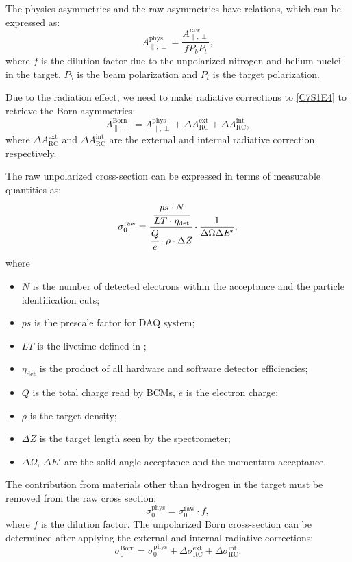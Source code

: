 The physics asymmetries and the raw asymmetries have relations, which can be expressed as:
\begin{equation} \label{C7S1E4}
A_{\parallel,\perp}^{\mathrm{phys}}=\frac{A_{\parallel,\perp}^{\mathrm{raw}}}{fP_bP_t},
\end{equation}
where $f$ is the dilution factor due to the unpolarized nitrogen and helium nuclei in the target, $P_b$ is the beam polarization and $P_t$ is the target polarization.

Due to the radiation effect, we need to make radiative corrections to \cref{C7S1E4} to retrieve the Born asymmetries:
\begin{equation} \label{C7S1E5}
A_{\parallel,\perp}^{\mathrm{Born}}=A_{\parallel,\perp}^{\mathrm{phys}}+\Delta A_{\mathrm{RC}}^{\mathrm{ext}}+\Delta A_{\mathrm{RC}}^{\mathrm{int}},
\end{equation}
where $\Delta A_{\mathrm{RC}}^{\mathrm{ext}}$ and $\Delta A_{\mathrm{RC}}^{\mathrm{int}}$ are the external and internal radiative correction respectively.

The raw unpolarized cross-section can be expressed in terms of measurable quantities as:
\begin{equation} \label{C7S1E6}
\sigma_0^{\mathrm{raw}} = \cfrac{\cfrac{ps\cdot N}{LT\cdot\eta_{\mathrm{det}}}}{\cfrac{Q}{e}\cdot\rho\cdot\Delta Z }\cdot\frac{1}{\Delta\Omega\Delta E'},
\end{equation}
where
\begin{itemize}[parsep=0pt]
\item $N$ is the number of detected electrons within the acceptance and the particle identification cuts;
\item $ps$ is the prescale factor for DAQ system;
\item $LT$ is the livetime defined in ;
\item $\eta_{\mathrm{det}}$ is the product of all hardware and software detector efficiencies;
\item $Q$ is the total charge read by BCMs, $e$ is the electron charge;
\item $\rho$ is the target density;
\item $\Delta Z$ is the target length seen by the spectrometer;
\item $\Delta\Omega$, $\Delta E'$ are the solid angle acceptance and the momentum acceptance.
\end{itemize}

The contribution from materials other than hydrogen in the target must be removed from the raw cross section:
\begin{equation} \label{C7S1E7}
\sigma_0^{\mathrm{phys}} = \sigma_0^{\mathrm{raw}}\cdot f,
\end{equation}
where $f$ is the dilution factor. The unpolarized Born cross-section can be determined after applying the external and internal radiative corrections:
\begin{equation} \label{C7S1E8}
\sigma_0^{\mathrm{Born}} = \sigma_0^{\mathrm{phys}}+\Delta \sigma_{\mathrm{RC}}^{\mathrm{ext}}+\Delta \sigma_{\mathrm{RC}}^{\mathrm{int}}.
\end{equation}

